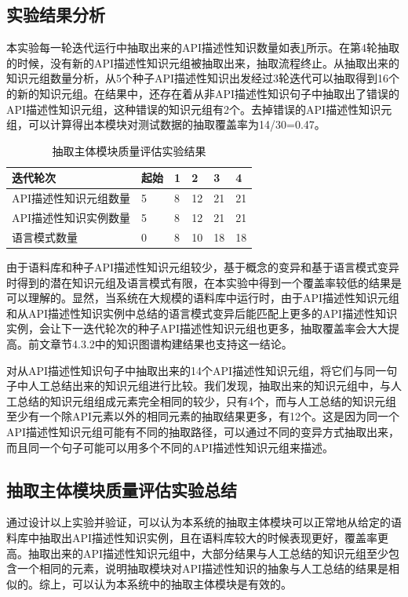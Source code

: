 \subsection{实验结果分析}
本实验每一轮迭代运行中抽取出来的API描述性知识数量如表\ref{fig:fig3}所示。在第4轮抽取的时候，没有新的API描述性知识元组被抽取出来，抽取流程终止。从抽取出来的知识元组数量分析，从5个种子API描述性知识出发经过3轮迭代可以抽取得到16个的新的知识元组。在结果中，还存在着从非API描述性知识句子中抽取出了错误的API描述性知识元组，这种错误的知识元组有2个。去掉错误的API描述性知识元组，可以计算得出本模块对测试数据的抽取覆盖率为14/30=0.47。

\begin{table}[h]
    \centering
    \caption{抽取主体模块质量评估实验结果}
    \label{fig:fig3}
    \begin{tabular}{|l|l|l|l|l|l|}
    \hline
    迭代轮次    & 起始 & 1 & 2  & 3  & 4  \\ \hline
    API描述性知识元组数量 & 5  & 8 & 12 & 21 & 21 \\ \hline
    API描述性知识实例数量 & 5  & 8 & 12 & 21 & 21 \\ \hline
    语言模式数量  & 0  & 8 & 10 & 18 & 18 \\ \hline
    \end{tabular}
    \end{table}

由于语料库和种子API描述性知识元组较少，基于概念的变异和基于语言模式变异时得到的潜在知识元组及语言模式有限，在本实验中得到一个覆盖率较低的结果是可以理解的。显然，当系统在大规模的语料库中运行时，由于API描述性知识元组和从API描述性知识实例中总结的语言模式变异后能匹配上更多的API描述性知识实例，会让下一迭代轮次的种子API描述性知识元组也更多，抽取覆盖率会大大提高。前文章节4.3.2中的知识图谱构建结果也支持这一结论。



对从API描述性知识句子中抽取出来的14个API描述性知识元组，将它们与同一句子中人工总结出来的知识元组进行比较。我们发现，抽取出来的知识元组中，与人工总结的知识元组组成元素完全相同的较少，只有4个，而与人工总结的知识元组至少有一个除API元素以外的相同元素的抽取结果更多，有12个。这是因为同一个API描述性知识元组可能有不同的抽取路径，可以通过不同的变异方式抽取出来，而且同一个句子可能可以用多个不同的API描述性知识元组来描述。

\subsection{抽取主体模块质量评估实验总结}
通过设计以上实验并验证，可以认为本系统的抽取主体模块可以正常地从给定的语料库中抽取出API描述性知识实例，且在语料库较大的时候表现更好，覆盖率更高。抽取出来的API描述性知识元组中，大部分结果与人工总结的知识元组至少包含一个相同的元素，说明抽取模块对API描述性知识的抽象与人工总结的结果是相似的。综上，可以认为本系统中的抽取主体模块是有效的。

